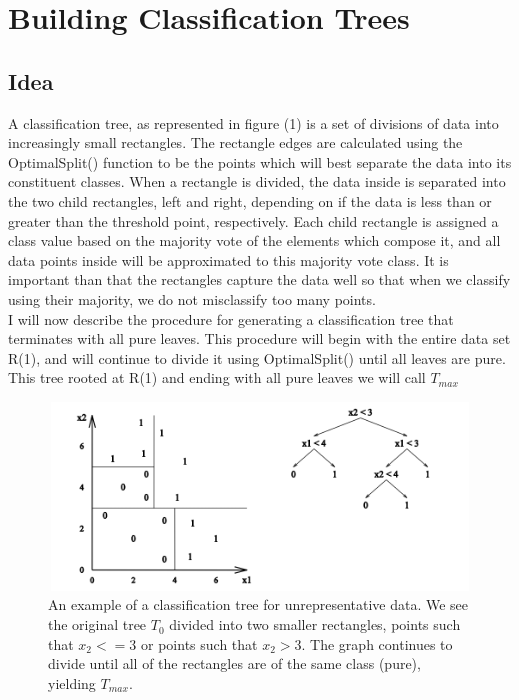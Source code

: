 \documentclass{article}
\begin{document}
\section*{Building Classification Trees}

\subsection*{Idea}
A classification tree, as represented in figure (1) is a set of divisions of data into increasingly small rectangles.  The rectangle edges are calculated using the OptimalSplit() function to be the points which will best separate the data into its constituent classes.  When a rectangle is divided, the data inside is separated into the two child rectangles, left and right, depending on if the data is less than or greater than the threshold point, respectively.  Each child rectangle is assigned a class value based on the majority vote of the elements which compose it, and all data points inside will be approximated to this majority vote class.  It is important than that the rectangles capture the data well so that when we classify using their majority, we do not misclassify too many points.  
\\I will now describe the procedure for generating a classification tree that terminates with all pure leaves.  This procedure will begin with the entire data set R(1), and will continue to divide it using OptimalSplit() until all leaves are pure.  This tree rooted at R(1) and ending with all pure leaves we will call $T_{max}$

\begin{figure}[H]
    \centerline
    {\includegraphics[width=12cm, height=5cm]{classification_tree_graphic.png}
    }
    \caption{\label{fig:my figure} An example of a classification tree for unrepresentative data.  We see the original tree $T_0$ divided into two smaller rectangles, points such that $x_2 <= 3$ or points such that $x_2 > 3$.  The graph continues to divide until all of the rectangles are of the same class (pure), yielding $T_{max}.$ }
\end{figure}
\end{document}
